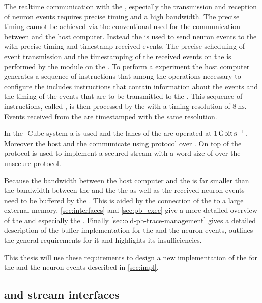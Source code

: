 The realtime communication with the \ASIC{}, especially the transmission and reception of neuron events  requires precise timing and a high bandwidth\autocite{ref:precise_timing}. The precise timing cannot be achieved via the conventional \Gigabitethernet{} used for the communication between \FPGA{} and the host computer.
Instead the \FPGA{} is used to send neuron events to the \ASIC{} with precise timing and timestamp received events. The precise scheduling of event transmission and the timestamping of the received events on the \FPGA{} is performed by the \pbexec{} module on the \FPGA{}.
To perform a experiment the host computer generates a sequence of instructions that among the operations necessary to configure the \ASIC{} includes instructions that contain information about the events and the timing of the events that are to be transmitted to the \ASIC{}. This sequence of instructions, called \PlaybackProgram{}, is then processed by the \pbexec{} with a timing resolution of $\SI{8}{\nano\second}$.
Events received from the \ASIC{} are timestamped with the same resolution.

In the \BSSTwo{}-Cube\autocite{ref:bss_cube} system a \Xilinx{}  \FPGA{} is used and the \LVDS{} lanes of the \ASIC{} are operated at $\SI{1}{\giga\bit\per\second}$. Moreover the host and the \FPGA{} communicate using \UDP{} protocol over \Gigabitethernet{}. On top of \UDP{} the \HostARQ{}\autocite{ref:hostarq} protocol is used to implement a secured stream with a word size of \PhyWordSize{} over the unsecure \UDP{} protocol.

Because the bandwidth between the host computer and the \FPGA{} is far smaller than the bandwidth between the \FPGA{} and the \ASIC{} the \PlaybackProgram{} as well as the received neuron events need to be buffered by the \FPGA{}. This is aided by the connection of the \FPGA{} to a large external memory.
\autoref{sec:interfaces} and \autoref{sec:pb_exec} give a more detailed overview of the \FPGA{} and especially the \pbexec{}. Finally \autoref{sec:old-pb-trace-management} gives a detailed description of the buffer implementation for the \PlaybackProgram{} and the neuron events, outlines the general requirements for it and highlights its insufficiencies.

This thesis will use these requirements to design a new implementation of the for the \PlaybackProgram{} and the neuron events described in \autoref{sec:impl}.



\subsection{\AXI{} and stream interfaces}\label{sec:interfaces}

